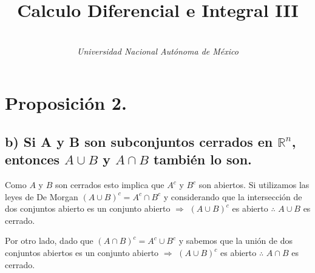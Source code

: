 \documentclass[secnumarabic,balancelastpage,amsmath,amssymb]{article}
\begin{document}
\title{\vspace{-15mm}\textbf{Calculo Diferencial e Integral III}}
\author{\\ \emph{Universidad Nacional Autónoma de México }}

\section{Proposición 2.}
\subsection{b) Si A y B son subconjuntos cerrados en $\mathbb {R}^{n}$, entonces $A\cup B$ y $A\cap B$ también lo son.}
Como $A$ y $B$ son cerrados esto implica que $A^{c}$ y $B^{c}$ son abiertos. Si utilizamos las leyes de De Morgan
$(A\cup B)^{c}=A^{c}\cap B^{c}$ y considerando que la intersección de dos conjuntos abierto es un conjunto abierto 
$\Rightarrow$ $(A\cup B)^{c}$ es abierto  $\therefore$   $A\cup B$ es cerrado.   

Por otro lado, dado que $(A\cap B)^{c}=A^{c}\cup B^{c}$ y sabemos que la unión de dos conjuntos abiertos es un conjunto abierto $\Rightarrow$ $(A\cup B)^{c}$ es abierto  $\therefore$  $A\cap B$ es cerrado.   
\end{document}
